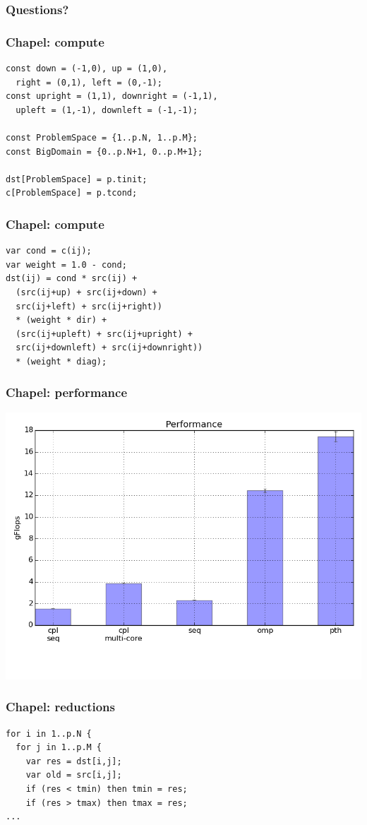 \documentclass{beamer}
\begin{document}
\begin{frame}
 \frametitle{Questions?}
\end{frame}

\begin{frame}[fragile]
 \frametitle{Chapel: compute}
\begin{verbatim}
const down = (-1,0), up = (1,0),
  right = (0,1), left = (0,-1);
const upright = (1,1), downright = (-1,1),
  upleft = (1,-1), downleft = (-1,-1);

const ProblemSpace = {1..p.N, 1..p.M};
const BigDomain = {0..p.N+1, 0..p.M+1};

dst[ProblemSpace] = p.tinit;
c[ProblemSpace] = p.tcond;
\end{verbatim}
\end{frame}

\begin{frame}[fragile]
 \frametitle{Chapel: compute}
\begin{verbatim}
var cond = c(ij);
var weight = 1.0 - cond;
dst(ij) = cond * src(ij) +
  (src(ij+up) + src(ij+down) +
  src(ij+left) + src(ij+right))
  * (weight * dir) +
  (src(ij+upleft) + src(ij+upright) +
  src(ij+downleft) + src(ij+downright))
  * (weight * diag);
\end{verbatim}
\end{frame}

\begin{frame}
 \frametitle{Chapel: performance}
 \includegraphics[width=\textwidth]{../cpl/report/per_no_reductions.png}
\end{frame}

\begin{frame}[fragile]
 \frametitle{Chapel: reductions}
\begin{verbatim}
for i in 1..p.N {
  for j in 1..p.M {
    var res = dst[i,j];
    var old = src[i,j];
    if (res < tmin) then tmin = res;
    if (res > tmax) then tmax = res;
...
\end{verbatim}
\end{frame}
\end{document}
